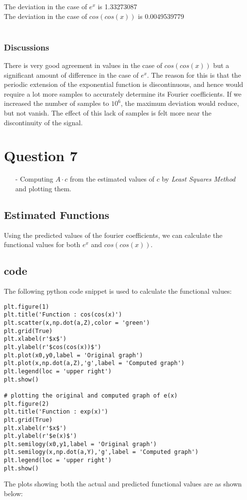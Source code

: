 \documentclass[11pt, a4paper, twoside]{article}
\begin{document}
The deviation in the case of $e^{x}$ is 1.33273087\\
The deviation in the case of $cos(cos(x))$ is 0.0049539779\\\\
 \subsubsection{Discussions}
There is very good agreement in values in the case of $cos(cos(x))$ but a significant amount of difference in the case of $e^{x}$. The reason for this is that the periodic extension of the exponential function is discontinuous, and hence would require a lot more samples to accurately determine its Fourier coefficients. If we increased the number of samples to $10^{6}$, the maximum deviation would reduce, but not vanish.
The effect of this lack of samples is felt more near the discontinuity of the signal.

\section{Question 7}
            \begin{itemize}
                \item[-] Computing $A\cdot c$ from the estimated values of $c$ by \textit{Least Squares Method} and plotting them.
            \end{itemize}

\subsection{Estimated Functions}
Using the predicted values of the fourier coefficients, we can calculate the functional values for both $e^{x}$ and $cos(cos(x))$.\\
\subsection{code}
The following python code snippet is used to calculate the functional values:
\begin{verbatim}	
plt.figure(1) 
plt.title('Function : cos(cos(x)')
plt.scatter(x,np.dot(a,Z),color = 'green')
plt.grid(True)
plt.xlabel(r'$x$')
plt.ylabel(r'$cos(cos(x))$')
plt.plot(x0,y0,label = 'Original graph')
plt.plot(x,np.dot(a,Z),'g',label = 'Computed graph')
plt.legend(loc = 'upper right')
plt.show()

# plotting the original and computed graph of e(x)
plt.figure(2)
plt.title('Function : exp(x)') 
plt.grid(True)
plt.xlabel(r'$x$')
plt.ylabel(r'$e(x)$')
plt.semilogy(x0,y1,label = 'Original graph')
plt.semilogy(x,np.dot(a,Y),'g',label = 'Computed graph')
plt.legend(loc = 'upper right')
plt.show()
\end{verbatim}
The plots showing both the actual and predicted functional values are as shown below:
\end{document}
